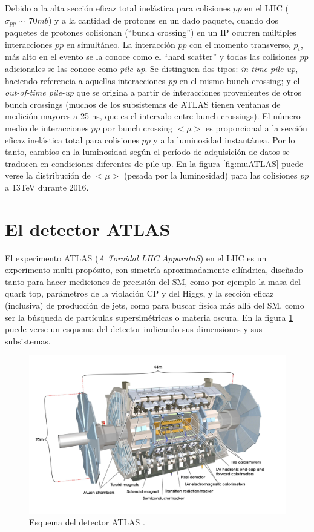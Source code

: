 Debido a la alta sección eficaz total inelástica para colisiones $pp$ en el LHC ($\sigma_{pp}\sim\,70mb$) y a la cantidad de protones en un dado paquete, cuando dos paquetes de protones colisionan (``bunch crossing'') en un IP ocurren múltiples interacciones $pp$ en simultáneo. La interacción $pp$ con el momento transverso, $p_t$, más alto en el evento se la conoce como el ``hard scatter'' y todas las colisiones $pp$ adicionales se las conoce como  \emph{pile-up}. Se distinguen dos tipos: \emph{in-time pile-up}, haciendo referencia a aquellas interacciones \emph{pp} en el mismo bunch crossing; y el \emph{out-of-time pile-up} que se origina a partir de interacciones provenientes de otros bunch crossings (muchos de los subsistemas de ATLAS tienen ventanas de medición mayores a 25 ns, que es el intervalo entre bunch-crossings). El número medio de interacciones $pp$ por bunch crossing $<\mu>$ es proporcional a la sección eficaz inelástica total para colisiones $pp$ y a la luminosidad instantánea. Por lo tanto, cambios en la luminosidad según el período de adquisición de datos se traducen en condiciones diferentes de pile-up. En la figura \ref{fig:muATLAS} puede verse la distribución de $<\mu>$ (pesada por la luminosidad) para las colisiones $pp$ a 13TeV durante 2016.

\section{El detector ATLAS}
El experimento ATLAS (\textit{A Toroidal LHC ApparatuS}) en el LHC es un experimento multi-propósito, con simetría aproximadamente cilíndrica, diseñado tanto para hacer mediciones de precisión del SM, como por ejemplo la masa del quark top, parámetros de la violación CP y del Higgs, y la sección eficaz (inclusiva) de producción de jets, como para buscar física más allá del SM, como ser la búsqueda de partículas supersimétricas o materia oscura. En la figura \ref{fig:OverviewATLAS} puede verse un esquema del detector indicando sus dimensiones y sus subsistemas. 

\begin{figure}[H]
    \centering
    \includegraphics[width =0.8\linewidth]{images/OverviewATLAS}
    \caption{ Esquema del detector ATLAS \cite{OverviewATLAS}.}
    \label{fig:OverviewATLAS}
\end{figure}



